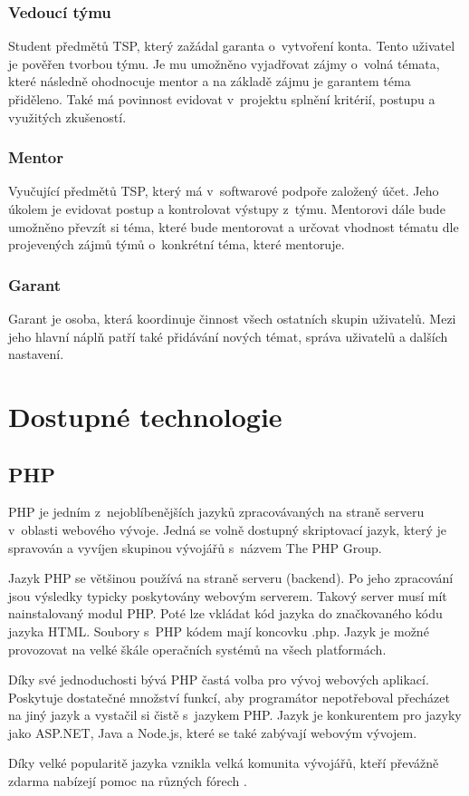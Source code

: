 \documentclass[czech,BP]{thesiskiv}
\begin{document}
	\subsection{Vedoucí týmu}
		\par Student předmětů TSP, který zažádal garanta o~vytvoření konta. Tento uživatel je pověřen tvorbou týmu. Je mu umožněno vyjadřovat zájmy o~volná témata, které následně ohodnocuje mentor a na základě zájmu je garantem téma přiděleno. Také má povinnost evidovat v~projektu splnění kritérií, postupu a využitých zkušeností.
	\subsection{Mentor}
		\par Vyučující předmětů TSP, který má v~softwarové podpoře založený účet. Jeho úkolem je evidovat postup a kontrolovat výstupy z~týmu. Mentorovi dále bude umožněno převzít si téma, které bude mentorovat a určovat vhodnost tématu dle projevených zájmů týmů o~konkrétní téma, které mentoruje.
	\subsection{Garant}
		\par Garant je osoba, která koordinuje činnost všech ostatních skupin uživatelů. Mezi jeho hlavní náplň patří také přidávání nových témat, správa uživatelů a dalších nastavení.

\chapter{Dostupné technologie}
\section{PHP}
\par PHP je jedním z~nejoblíbenějších jazyků zpracovávaných na straně serveru v~oblasti webového vývoje. Jedná se volně dostupný skriptovací jazyk, který je spravován a vyvíjen skupinou vývojářů s~názvem The PHP Group.
\par Jazyk PHP se většinou používá na straně serveru (backend). Po jeho zpracování jsou výsledky typicky poskytovány webovým serverem. Takový server musí mít nainstalovaný modul PHP. Poté lze vkládat kód jazyka do značkovaného kódu jazyka HTML. Soubory s~PHP kódem mají koncovku .php. Jazyk je možné provozovat na velké škále operačních systémů na všech platformách.
\par Díky své jednoduchosti bývá PHP častá volba pro vývoj webových aplikací. Poskytuje dostatečné množství funkcí, aby programátor nepotřeboval přecházet na jiný jazyk a vystačil si čistě s~jazykem PHP. Jazyk je konkurentem pro jazyky jako ASP.NET, Java a Node.js, které se také zabývají webovým vývojem.
\par Díky velké popularitě jazyka vznikla velká komunita vývojářů, kteří převážně zdarma nabízejí pomoc na různých fórech \cite{PHPOkamzite}.
\end{document}
